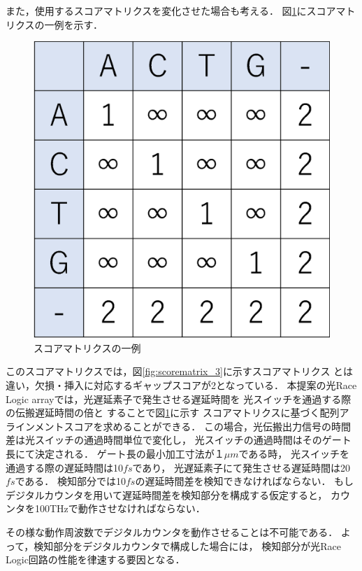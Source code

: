 また，使用するスコアマトリクスを変化させた場合も考える．
図\ref{fig:scorematrix_4}にスコアマトリクスの一例を示す．
\begin{figure}[t!]
\begin{center}
\includegraphics[keepaspectratio,scale=0.4]{fig/5/scorematrix_4.eps}
\caption{スコアマトリクスの一例}
\label{fig:scorematrix_4}
\end{center}
\end{figure}
このスコアマトリクスでは，図\ref{fig:scorematrix_3}に示すスコアマトリクス
とは違い，欠損・挿入に対応するギャップスコアが2となっている．
本提案の光Race Logic arrayでは，光遅延素子で発生させる遅延時間を
光スイッチを通過する際の伝搬遅延時間の倍と
することで図\ref{fig:scorematrix_4}に示す
スコアマトリクスに基づく配列アラインメントスコアを求めることができる．
この場合，光伝搬出力信号の時間差は光スイッチの通過時間単位で変化し，
光スイッチの通過時間はそのゲート長にて決定される．
ゲート長の最小加工寸法が１$\mu m$である時，
光スイッチを通過する際の遅延時間は10$fs$であり，
光遅延素子にて発生させる遅延時間は20$fs$である．
検知部分では10$fs$の遅延時間差を検知できなければならない．
もしデジタルカウンタを用いて遅延時間差を検知部分を構成する仮定すると，
カウンタを100THzで動作させなければならない．

その様な動作周波数でデジタルカウンタを動作させることは不可能である．
よって，検知部分をデジタルカウンタで構成した場合には，
検知部分が光Race Logic回路の性能を律速する要因となる．

